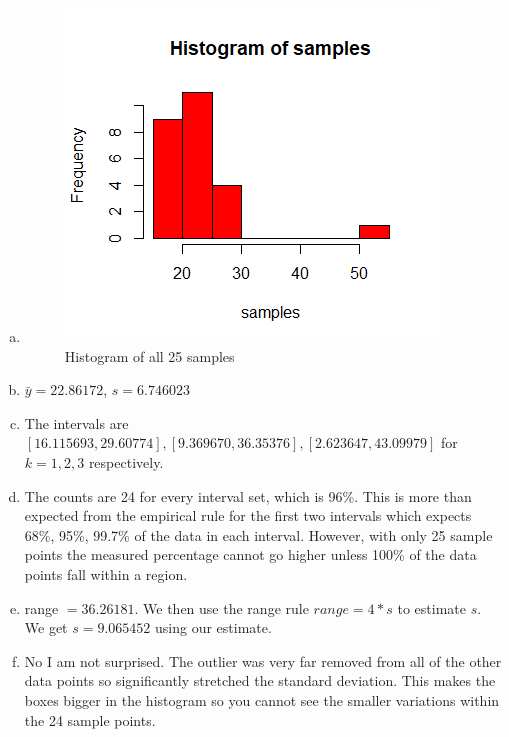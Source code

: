 \documentclass[11pt]{article}
\begin{document}
\begin{enumerate}[a.]

\item 

\begin{figure}[h!]
    \centering
    \includegraphics[scale=1]{./pics/histWithOutlier.png}
    \caption{Histogram of all 25 samples}
    \label{fig:histWith}
\end{figure}

\item $\bar{y} = 22.86172$, $s = 6.746023$

\item The intervals are $[16.115693, 29.60774], [9.369670, 36.35376], [2.623647, 43.09979]$ for $k = 1, 2, 3$ respectively.

\item The counts are 24 for every interval set, which is 96\%. This is more than expected from the empirical rule for the first two intervals which expects 68\%, 95\%, 99.7\% of the data in each interval. However, with only 25 sample points the measured percentage cannot go higher unless 100\% of the data points fall within a region.

\item  range $= 36.26181$. We then use the range rule $range = 4 * s$ to estimate $s$. We get $s = 9.065452$ using our estimate.

\item No I am not surprised. The outlier was very far removed from all of the other data points so significantly stretched the standard deviation. This makes the boxes bigger in the histogram so you cannot see the smaller variations within the 24 sample points.


\end{enumerate}
\end{document}

